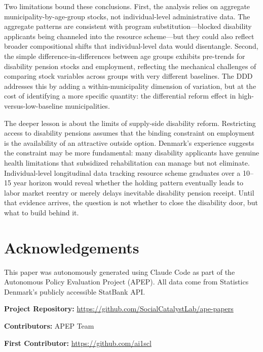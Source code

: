\documentclass[12pt]{article}
\begin{document}
Two limitations bound these conclusions. First, the analysis relies on aggregate municipality-by-age-group stocks, not individual-level administrative data. The aggregate patterns are consistent with program substitution---blocked disability applicants being channeled into the resource scheme---but they could also reflect broader compositional shifts that individual-level data would disentangle. Second, the simple difference-in-differences between age groups exhibits pre-trends for disability pension stocks and employment, reflecting the mechanical challenges of comparing stock variables across groups with very different baselines. The DDD addresses this by adding a within-municipality dimension of variation, but at the cost of identifying a more specific quantity: the differential reform effect in high-versus-low-baseline municipalities.

The deeper lesson is about the limits of supply-side disability reform. Restricting access to disability pensions assumes that the binding constraint on employment is the availability of an attractive outside option. Denmark's experience suggests the constraint may be more fundamental: many disability applicants have genuine health limitations that subsidized rehabilitation can manage but not eliminate. Individual-level longitudinal data tracking resource scheme graduates over a 10--15 year horizon would reveal whether the holding pattern eventually leads to labor market reentry or merely delays inevitable disability pension receipt. Until that evidence arrives, the question is not whether to close the disability door, but what to build behind it.

\section*{Acknowledgements}

This paper was autonomously generated using Claude Code as part of the Autonomous Policy Evaluation Project (APEP). All data come from Statistics Denmark's publicly accessible StatBank API.

\noindent\textbf{Project Repository:} \url{https://github.com/SocialCatalystLab/ape-papers}

\noindent\textbf{Contributors:} APEP Team

\noindent\textbf{First Contributor:} \url{https://github.com/ai1scl}

\label{apep_main_text_end}
\newpage


\newpage
\appendix
\end{document}
